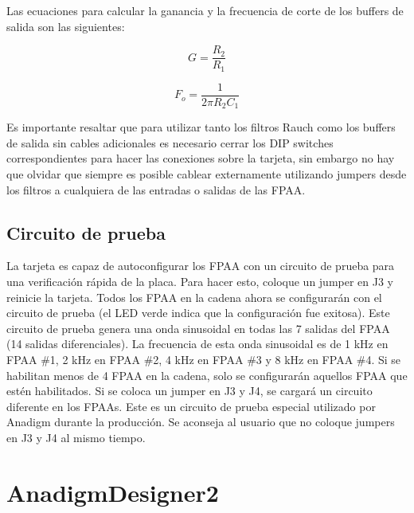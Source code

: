 	Las ecuaciones para calcular la ganancia y la frecuencia de corte de los buffers de salida son las siguientes:
	
	\begin{equation}
		G = \frac{R_{2}}{R_{1}}
	\end{equation}
	
	\begin{equation}
		F_{o} = \frac{1}{2 \pi R_{2} C_{1}}
	\end{equation}
	
	Es importante resaltar que para utilizar tanto los filtros Rauch como los buffers de salida sin cables adicionales es necesario cerrar los DIP switches correspondientes para hacer las conexiones sobre la tarjeta, sin embargo no hay que olvidar que siempre es posible cablear externamente utilizando jumpers desde los filtros a cualquiera de las entradas o salidas de las FPAA.
	
		\subsection{Circuito de prueba}

	La tarjeta es capaz de autoconfigurar los FPAA con un circuito de prueba para una verificación rápida de la placa. Para hacer esto, coloque un jumper en J3 y reinicie la tarjeta. Todos los FPAA en la cadena ahora se configurarán con el circuito de prueba (el LED verde indica que la configuración fue exitosa). Este circuito de prueba genera una onda sinusoidal en todas las 7 salidas del FPAA (14 salidas diferenciales). La frecuencia de esta onda sinusoidal es de 1 kHz en FPAA \#{}1, 2 kHz en FPAA \#{}2, 4 kHz en FPAA \#{}3 y 8 kHz en FPAA \#{}4. Si se habilitan menos de 4 FPAA en la cadena, solo se configurarán aquellos FPAA que estén habilitados. Si se coloca un jumper en J3 y J4, se cargará un circuito diferente en los FPAAs. Este es un circuito de prueba especial utilizado por Anadigm durante la producción. Se aconseja al usuario que no coloque jumpers en J3 y J4 al mismo tiempo.

	\section{AnadigmDesigner2}
	
